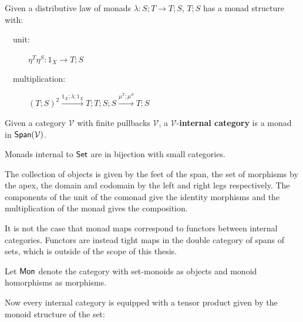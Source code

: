 \begin{lemma}
Given a distributive law of monads $\lambda:S;T\to T;S$,
$T;S$ has a monad structure with:
\begin{description}
\item[\ \ unit:] $\eta^T\eta^S:1_{X} \to T;S $
\item[\ \ multiplication:] $(T;S)^2 \xrightarrow{1_X; \lambda ; 1_X} T;T;S;S \xrightarrow{\mu^T;\mu^S} T;S$
\end{description}
\end{lemma}



\begin{definition}
\label{def:internalcat}

Given a category $\mathcal V$ with finite pullbacks $\mathcal V$, a $\mathcal V$-{\bf internal category} is a monad in $\mathsf{Span}(\mathcal V)$.
\end{definition}


\begin{lemma}
\label{lem:internalcat}

Monads internal to $\mathsf{Set}$ are in bijection with small categories.
\end{lemma}

The collection of objects is given by the feet of the span, the set of morphisms by the apex, the domain and codomain by the left and right legs respectively.  The components of the unit of the comonad give the identity morphisms and the multiplication of the monad gives the composition.


It is not the case that monad maps correspond to functors between internal categories.  Functors are instead tight maps in the double category of spans of sets, which is outside of the scope of this thesis. 







\begin{definition}
\label{def:monoid}
Let ${\sf Mon}$ denote the category with set-monoids as objects and monoid homorphisms as morphisms.
\end{definition}

Now every internal category is equipped with a tensor product given by the monoid structure of the set:


